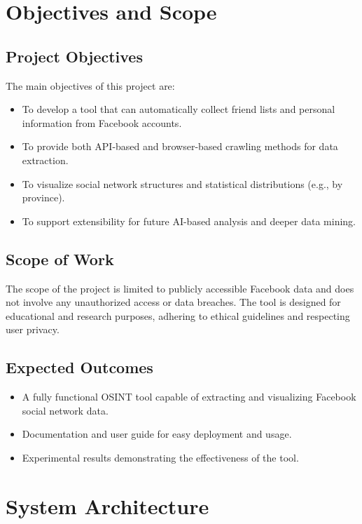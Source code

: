 \documentclass[13pt,a4paper]{report}
\begin{document}
\chapter{Objectives and Scope}
\section{Project Objectives}
The main objectives of this project are:
\begin{itemize}
    \item To develop a tool that can automatically collect friend lists and personal information from Facebook accounts.
    \item To provide both API-based and browser-based crawling methods for data extraction.
    \item To visualize social network structures and statistical distributions (e.g., by province).
    \item To support extensibility for future AI-based analysis and deeper data mining.
\end{itemize}

\section{Scope of Work}
The scope of the project is limited to publicly accessible Facebook data and does not involve any unauthorized access or data breaches. The tool is designed for educational and research purposes, adhering to ethical guidelines and respecting user privacy.

\section{Expected Outcomes}
\begin{itemize}
    \item A fully functional OSINT tool capable of extracting and visualizing Facebook social network data.
    \item Documentation and user guide for easy deployment and usage.
    \item Experimental results demonstrating the effectiveness of the tool.
\end{itemize}

\chapter{System Architecture}
\end{document}
